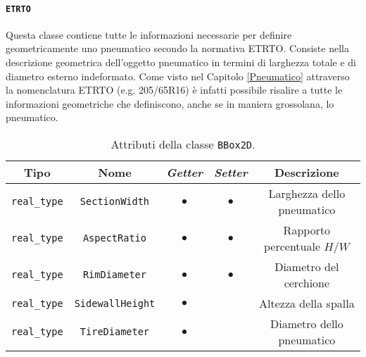\paragraph{\texttt{ETRTO}}
Questa classe contiene tutte le informazioni necessarie per definire geometricamente uno pneumatico secondo la normativa \ac{ETRTO}. Consiste nella descrizione geometrica dell'oggetto pneumatico in termini di larghezza totale e di diametro esterno indeformato. Come visto nel Capitolo \ref{Pneumatico} attraverso la nomenclatura \ac{ETRTO} (e.g. 205/65R16) è infatti possibile risalire a tutte le informazioni geometriche che definiscono, anche se in maniera grossolana, lo pneumatico.
\begin{table}[h!]
	\centering
	\begin{tabular}{|c|c|c|c|c|}
		\hline 
		\textbf{Tipo} & \textbf{Nome} & \textit{\textbf{Getter}} & \textit{\textbf{Setter}} & \textbf{Descrizione} \\ \hline 
		\texttt{real\_type} & \texttt{SectionWidth} & $\bullet$ & $\bullet$ & Larghezza dello pneumatico \\ \hline 
		\texttt{real\_type} & \texttt{AspectRatio} & $\bullet$ & $\bullet$ & Rapporto percentuale $H/W$ \\ \hline
		\texttt{real\_type} & \texttt{RimDiameter} & $\bullet$ & $\bullet$ & Diametro del cerchione\\ \hline
		\texttt{real\_type} & \texttt{SidewallHeight} & $\bullet$ & & Altezza della spalla \\ \hline
		\texttt{real\_type} & \texttt{TireDiameter} & $\bullet$ & & Diametro dello pneumatico\\ \hline
	\end{tabular}
	\caption{Attributi della classe \texttt{BBox2D}.}
	\label{}
\end{table}
%
